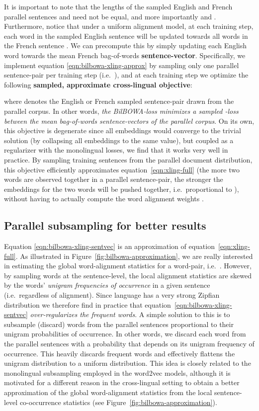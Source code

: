 \documentclass[10pt]{article}
\newcommand\bld[1]{\textbf{#1}}
\begin{document}
It is important to note that the lengths of the sampled English and French parallel 
sentences  and  need not be equal, and more importantly  and 
. Furthermore, notice that under a uniform alignment model, at each 
training step, each word
in the sampled English sentence  will be updated towards all words in the
French sentence . We can precompute this by simply updating each English
word towards the mean French bag-of-words \bld{sentence-vector}. Specifically,
we implement equation \ref{eqn:bilbowa-xling-approx} by sampling only one parallel 
sentence-pair per training step (i.e.\ ), and at each
training step  we optimize the following \bld{sampled, approximate cross-lingual
objective}:

where  denotes the English or French sampled sentence-pair drawn from the
parallel corpus.  In other words, \emph{the BilBOWA-loss minimizes a sampled
-loss between the mean bag-of-words sentence-vectors of the parallel corpus}.
On its own, this objective is degenerate since all embeddings would converge to
the trivial solution (by collapsing all embeddings to the same value), but
coupled as a regularizer with the monolingual losses, we find that it works
very well in practice. By sampling training sentences from the parallel document
distribution, this objective efficiently approximates equation~\ref{eqn:xling-full} 
(the more two words are observed together in a parallel sentence-pair, the
stronger the embeddings for the two words will be pushed together, i.e.\
proportional to ), without having to actually compute the word 
alignment weights .

\subsection{Parallel subsampling for better results}
Equation \ref{eqn:bilbowa-xling-sentvec} is an approximation of
equation~\ref{eqn:xling-full}.  As illustrated in
Figure~\ref{fig:bilbowa-approximation}, we are really interested in estimating
the global word-alignment statistics for a word-pair, i.e.\ .
However, by sampling words at the sentence-level, the local alignment
statistics are skewed by the words' \emph{unigram frequencies of occurrence} in
a given sentence (i.e.\ regardless of alignment). Since language has a very
strong Zipfian distribution we therefore find in practice that
equation~\ref{eqn:bilbowa-xling-sentvec} \emph{over-regularizes the frequent
words}.  A simple solution to this is to subsample (discard) words from the
parallel sentences proportional to their unigram probabilities of occurrence.
In other words, we discard each word from the parallel sentences with a probability 
that depends on its unigram frequency of occurrence. This heavily discards frequent words
and effectively flattens the unigram distribution to a uniform distribution. This idea
is closely related to the monolingual subsampling employed in the word2vec models,
although it is motivated for a different reason in the cross-lingual setting to obtain 
a better approximation of the global word-alignment statistics from the local sentence-level 
co-occurrence statistics (see Figure~\ref{fig:bilbowa-approximation}).
\end{document}
